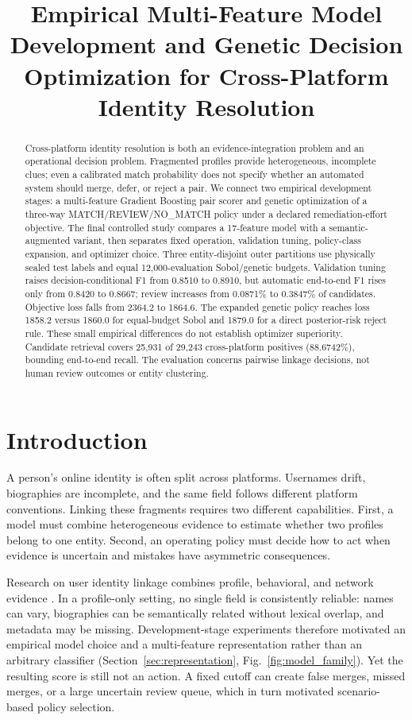\documentclass[conference]{IEEEtran}
\title{Empirical Multi-Feature Model Development and Genetic Decision Optimization for Cross-Platform Identity Resolution}
\author{\IEEEauthorblockN{Anonymous Submission}}
\begin{document}
\maketitle

\begin{abstract}
Cross-platform identity resolution is both an evidence-integration problem and an operational decision problem. Fragmented profiles provide heterogeneous, incomplete clues; even a calibrated match probability does not specify whether an automated system should merge, defer, or reject a pair. We connect two empirical development stages: a multi-feature Gradient Boosting pair scorer and genetic optimization of a three-way MATCH/REVIEW/NO\_MATCH policy under a declared remediation-effort objective. The final controlled study compares a 17-feature model with a semantic-augmented variant, then separates fixed operation, validation tuning, policy-class expansion, and optimizer choice. Three entity-disjoint outer partitions use physically sealed test labels and equal 12,000-evaluation Sobol/genetic budgets. Validation tuning raises decision-conditional F1 from 0.8510 to 0.8910, but automatic end-to-end F1 rises only from 0.8420 to 0.8667; review increases from 0.0871\% to 0.3847\% of candidates. Objective loss falls from 2364.2 to 1864.6. The expanded genetic policy reaches loss 1858.2 versus 1860.0 for equal-budget Sobol and 1879.0 for a direct posterior-risk reject rule. These small empirical differences do not establish optimizer superiority. Candidate retrieval covers 25,931 of 29,243 cross-platform positives (88.6742\%), bounding end-to-end recall. The evaluation concerns pairwise linkage decisions, not human review outcomes or entity clustering.
\end{abstract}

\section{Introduction}
A person's online identity is often split across platforms. Usernames drift, biographies are incomplete, and the same field follows different platform conventions. Linking these fragments requires two different capabilities. First, a model must combine heterogeneous evidence to estimate whether two profiles belong to one entity. Second, an operating policy must decide how to act when evidence is uncertain and mistakes have asymmetric consequences.

Research on user identity linkage combines profile, behavioral, and network evidence \cite{shu2017uilreview,linkSocial2018,yao2023profile}. In a profile-only setting, no single field is consistently reliable: names can vary, biographies can be semantically related without lexical overlap, and metadata may be missing. Development-stage experiments therefore motivated an empirical model choice and a multi-feature representation rather than an arbitrary classifier (Section~\ref{sec:representation}, Fig.~\ref{fig:model_family}). Yet the resulting score is still not an action. A fixed cutoff can create false merges, missed merges, or a large uncertain review queue, which in turn motivated scenario-based policy selection.
\end{document}
